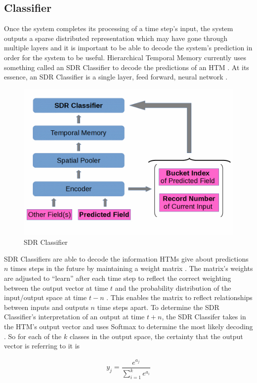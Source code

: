 \documentclass[oneside,12pt,openany]{book}
\begin{document}
	\subsection{Classifier}
	
	Once the system completes its processing of a time step's input, the system outputs a sparse distributed representation which may have gone through multiple layers and it is important to be able to decode the system's prediction in order for the system to be useful. Hierarchical Temporal Memory currently uses something called an SDR Classifier to decode the predictions of an HTM \cite{Dillon}. At its essence, an SDR Classifier is a single layer, feed forward, neural network \cite{Dillon}.
	
	\begin{figure}[!ht]
		\centering
		\includegraphics[width=.6\linewidth]{images/SDRClassifier.jpg}
		\caption{SDR Classifier}
		\label{fig 3}
	\end{figure}
	
	SDR Classifiers are able to decode the information HTMs give about predictions $n$ times steps in the future by maintaining a weight matrix \cite{Dillon}. The matrix's weights are adjusted to ``learn'' after each time step to reflect the correct weighting between the output vector at time $t$ and the probability distribution of the input/output space at time $t-n$ \cite{Dillon}. This enables the matrix to reflect relationships between inputs and outputs $n$ time steps apart. To determine the SDR Classifier's interpretation of an output at time $t+n$, the SDR Classifer takes in the HTM's output vector and uses Softmax to determine the most likely decoding \cite{Dillon}. So for each of the $k$ classes in the output space, the certainty that the output vector is referring to it is 
	
	\begin{align}
	\label{eqn:htmclassact}
	y_{j} = \dfrac{e^{a_{j}}}{\sum_{i=1}^{k} e^{a_{i}}}
	\end{align}
	
\end{document}

